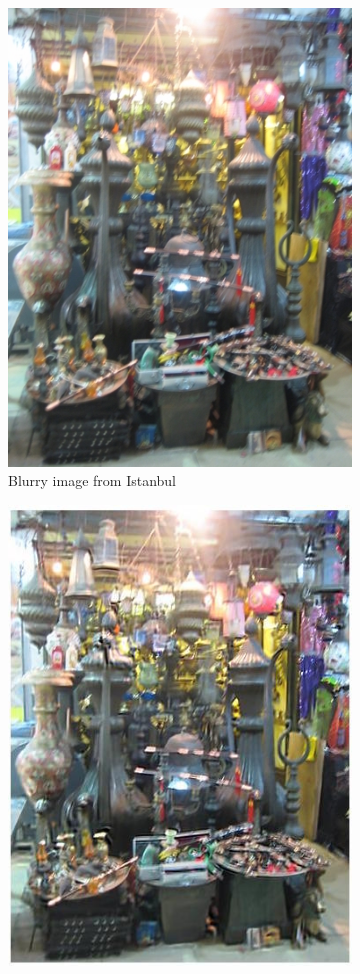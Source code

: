 \documentclass[10pt,twocolumn,letterpaper]{article}
\begin{document}
\begin{figure}
\begin{center}
\begin{subfigure}{0.23\textwidth}
\includegraphics[width=0.9\linewidth]{istanbul_s01_it0000_blurry} 
\caption{Blurry image from Istanbul}
\label{fig:subim4}
\end{subfigure}
\begin{subfigure}{0.23\textwidth}
\includegraphics[width=0.9\linewidth]{istanbul_deblurred}

\end{subfigure}
\end{center}
\end{figure}
\end{document}
